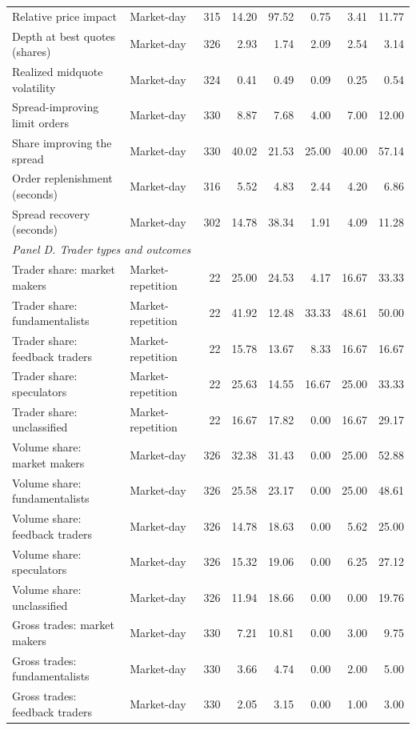 \begin{tabular}{llrrrrrr}
Relative price impact & Market-day & 315 & 14.20 & 97.52 & 0.75 & 3.41 & 11.77 \\
Depth at best quotes (shares) & Market-day & 326 & 2.93 & 1.74 & 2.09 & 2.54 & 3.14 \\
Realized midquote volatility & Market-day & 324 & 0.41 & 0.49 & 0.09 & 0.25 & 0.54 \\
Spread-improving limit orders & Market-day & 330 & 8.87 & 7.68 & 4.00 & 7.00 & 12.00 \\
Share improving the spread & Market-day & 330 & 40.02 & 21.53 & 25.00 & 40.00 & 57.14 \\
Order replenishment (seconds) & Market-day & 316 & 5.52 & 4.83 & 2.44 & 4.20 & 6.86 \\
Spread recovery (seconds) & Market-day & 302 & 14.78 & 38.34 & 1.91 & 4.09 & 11.28 \\
\multicolumn{8}{l}{\textit{Panel D. Trader types and outcomes}} \\
Trader share: market makers & Market-repetition & 22 & 25.00 & 24.53 & 4.17 & 16.67 & 33.33 \\
Trader share: fundamentalists & Market-repetition & 22 & 41.92 & 12.48 & 33.33 & 48.61 & 50.00 \\
Trader share: feedback traders & Market-repetition & 22 & 15.78 & 13.67 & 8.33 & 16.67 & 16.67 \\
Trader share: speculators & Market-repetition & 22 & 25.63 & 14.55 & 16.67 & 25.00 & 33.33 \\
Trader share: unclassified & Market-repetition & 22 & 16.67 & 17.82 & 0.00 & 16.67 & 29.17 \\
Volume share: market makers & Market-day & 326 & 32.38 & 31.43 & 0.00 & 25.00 & 52.88 \\
Volume share: fundamentalists & Market-day & 326 & 25.58 & 23.17 & 0.00 & 25.00 & 48.61 \\
Volume share: feedback traders & Market-day & 326 & 14.78 & 18.63 & 0.00 & 5.62 & 25.00 \\
Volume share: speculators & Market-day & 326 & 15.32 & 19.06 & 0.00 & 6.25 & 27.12 \\
Volume share: unclassified & Market-day & 326 & 11.94 & 18.66 & 0.00 & 0.00 & 19.76 \\
Gross trades: market makers & Market-day & 330 & 7.21 & 10.81 & 0.00 & 3.00 & 9.75 \\
Gross trades: fundamentalists & Market-day & 330 & 3.66 & 4.74 & 0.00 & 2.00 & 5.00 \\
Gross trades: feedback traders & Market-day & 330 & 2.05 & 3.15 & 0.00 & 1.00 & 3.00 \\

\end{tabular}
